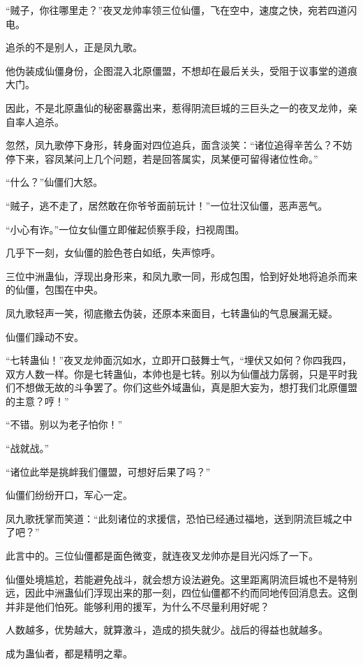 
\begin{this_body}

“贼子，你往哪里走？”夜叉龙帅率领三位仙僵，飞在空中，速度之快，宛若四道闪电。

追杀的不是别人，正是凤九歌。

他伪装成仙僵身份，企图混入北原僵盟，不想却在最后关头，受阻于议事堂的道痕大门。

因此，不是北原蛊仙的秘密暴露出来，惹得阴流巨城的三巨头之一的夜叉龙帅，亲自率人追杀。

忽然，凤九歌停下身形，转身面对四位追兵，面含淡笑：“诸位追得辛苦么？不妨停下来，容凤某问上几个问题，若是回答属实，凤某便可留得诸位性命。”

“什么？”仙僵们大怒。

“贼子，逃不走了，居然敢在你爷爷面前玩计！”一位壮汉仙僵，恶声恶气。

“小心有诈。”一位女仙僵立即催起侦察手段，扫视周围。

几乎下一刻，女仙僵的脸色苍白如纸，失声惊呼。

三位中洲蛊仙，浮现出身形来，和凤九歌一同，形成包围，恰到好处地将追杀而来的仙僵，包围在中央。

凤九歌轻声一笑，彻底撤去伪装，还原本来面目，七转蛊仙的气息展漏无疑。

仙僵们躁动不安。

“七转蛊仙！”夜叉龙帅面沉如水，立即开口鼓舞士气，“埋伏又如何？你四我四，双方人数一样。你是七转蛊仙，本帅也是七转。别以为仙僵战力孱弱，只是平时我们不想做无故的斗争罢了。你们这些外域蛊仙，真是胆大妄为，想打我们北原僵盟的主意？哼！”

“不错。别以为老子怕你！”

“战就战。”

“诸位此举是挑衅我们僵盟，可想好后果了吗？”

仙僵们纷纷开口，军心一定。

凤九歌抚掌而笑道：“此刻诸位的求援信，恐怕已经通过福地，送到阴流巨城之中了吧？”

此言中的。三位仙僵都是面色微变，就连夜叉龙帅亦是目光闪烁了一下。

仙僵处境尴尬，若能避免战斗，就会想方设法避免。这里距离阴流巨城也不是特别远，因此中洲蛊仙们浮现出来的那一刻，四位仙僵都不约而同地传回消息去。这倒并非是他们怕死。能够利用的援军，为什么不尽量利用好呢？

人数越多，优势越大，就算激斗，造成的损失就少。战后的得益也就越多。

成为蛊仙者，都是精明之辈。


\end{this_body}
